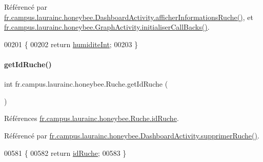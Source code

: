 Référencé par \hyperlink{classfr_1_1campus_1_1laurainc_1_1honeybee_1_1_dashboard_activity_a88f00531bee33bd6c47b33f5ac4df9ed}{fr.\+campus.\+laurainc.\+honeybee.\+Dashboard\+Activity.\+afficher\+Informations\+Ruche()}, et \hyperlink{classfr_1_1campus_1_1laurainc_1_1honeybee_1_1_graph_activity_a8dc56c3e0744bcb9295ad10e726b5fdb}{fr.\+campus.\+laurainc.\+honeybee.\+Graph\+Activity.\+initialiser\+Call\+Backs()}.


\begin{DoxyCode}
00201                                    \{
00202         \textcolor{keywordflow}{return} \hyperlink{classfr_1_1campus_1_1laurainc_1_1honeybee_1_1_ruche_ad56a25b2e432592a20a5f7f4347f92f9}{humiditeInt};
00203     \}
\end{DoxyCode}
\mbox{\label{classfr_1_1campus_1_1laurainc_1_1honeybee_1_1_ruche_ace3993bb5f36dc8c63f18bcc3ac75adf}} 
\paragraph{\texorpdfstring{get\+Id\+Ruche()}{getIdRuche()}}
{\footnotesize\ttfamily int fr.\+campus.\+laurainc.\+honeybee.\+Ruche.\+get\+Id\+Ruche (\begin{DoxyParamCaption}{ }\end{DoxyParamCaption})}



Références \hyperlink{classfr_1_1campus_1_1laurainc_1_1honeybee_1_1_ruche_aee4d51dd1634b799427d89e168cdadf4}{fr.\+campus.\+laurainc.\+honeybee.\+Ruche.\+id\+Ruche}.



Référencé par \hyperlink{classfr_1_1campus_1_1laurainc_1_1honeybee_1_1_dashboard_activity_ae77451bd85101ed42644c2421cd2234f}{fr.\+campus.\+laurainc.\+honeybee.\+Dashboard\+Activity.\+supprimer\+Ruche()}.


\begin{DoxyCode}
00581                             \{
00582         \textcolor{keywordflow}{return} \hyperlink{classfr_1_1campus_1_1laurainc_1_1honeybee_1_1_ruche_aee4d51dd1634b799427d89e168cdadf4}{idRuche};
00583     \}
\end{DoxyCode}
\mbox{\label{classfr_1_1campus_1_1laurainc_1_1honeybee_1_1_ruche_a8c4c0db39c42733517035c4211e0ff95}} 
